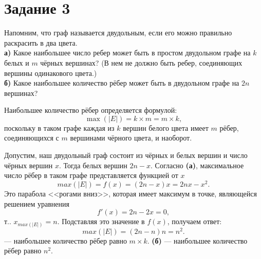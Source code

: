 \documentclass[a4paper,12pt]{article}
\begin{document}
\section*{Задание 3}
Напомним, что граф называется двудольным, если его можно правильно раскрасить в два цвета.\\
{\bf а)}  Какое наибольшее число ребер может быть в простом двудольном графе на $k$ белых и $m$ чёрных вершинах? (В нем не должно быть ребер, соединяющих вершины одинакового цвета.)\\
{\bf б)} Какое наибольшее количество рёбер может быть в двудольном графе на $2n$ вершинах?\par
\vspace{5pt}
 \par
{} Наибольшее количество рёбер определяется формулой:
$$\max(|E|)=k \times m=m \times k,$$
поскольку в таком графе каждая из $k$ вершин белого цвета имеет $m$ рёбер, соединяющихся с $m$ вершинами чёрного цвета, и наоборот.\par
\vspace{5pt}
 Допустим, наш двудольный граф состоит из чёрных и белых вершин и число чёрных вершин $x$. Тогда белых вершин $2n-x$. Согласно  {\bf (а)}, максимальное число рёбер в таком графе представляется функцией от $x$
$$max(|E|)=f(x)=(2n-x)x=2nx-x^2.$$
Это парабола <<рогами вниз>>, которая имеет максимум в точке, являющейся решением уравнения
$$f'(x)=2n-2x=0,$$
т.. $x_{max(|E|)}=n$. Подставляя это значение в $f(x)$, получаем ответ:
$$max(|E|)=(2n-n)n=n^2.$$
 --- наибольшее количество рёбер равно $m \times k$. {\bf (б)} --- наибольшее количество рёбер равно $n^2$.\par
\end{document}
